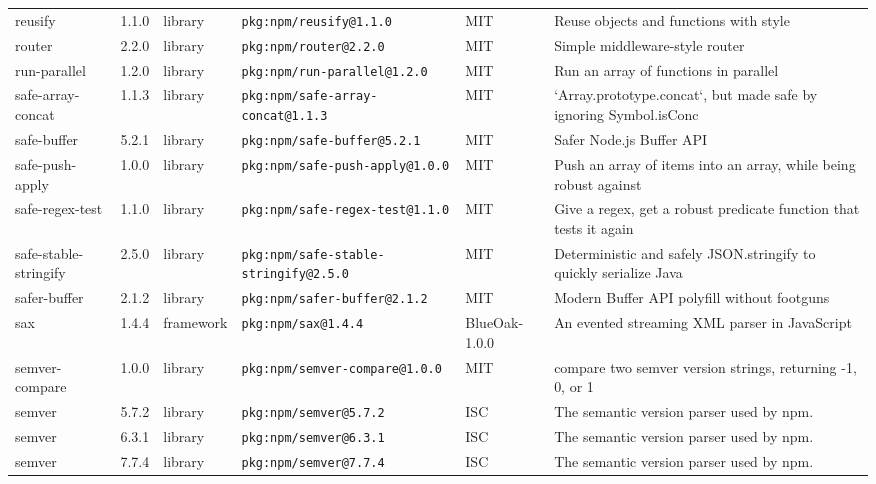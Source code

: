 \documentclass[11pt,a4paper]{article}
\begin{document}
\begin{longtable}{|p{4cm}|p{2cm}|p{1.6cm}|p{5cm}|p{1.5cm}|p{3.5cm}|}
\raggedright reusify & 1.1.0 & library & \small\texttt{pkg:npm/reusify@1.1.0} & MIT & \small Reuse objects and functions with style \\
\raggedright router & 2.2.0 & library & \small\texttt{pkg:npm/router@2.2.0} & MIT & \small Simple middleware-style router \\
\raggedright run-parallel & 1.2.0 & library & \small\texttt{pkg:npm/run-parallel@1.2.0} & MIT & \small Run an array of functions in parallel \\
\raggedright safe-array-concat & 1.1.3 & library & \small\texttt{pkg:npm/safe-array-concat@1.1.3} & MIT & \small `Array.prototype.concat`, but made safe by ignoring Symbol.isConc \\
\raggedright safe-buffer & 5.2.1 & library & \small\texttt{pkg:npm/safe-buffer@5.2.1} & MIT & \small Safer Node.js Buffer API \\
\raggedright safe-push-apply & 1.0.0 & library & \small\texttt{pkg:npm/safe-push-apply@1.0.0} & MIT & \small Push an array of items into an array, while being robust against  \\
\raggedright safe-regex-test & 1.1.0 & library & \small\texttt{pkg:npm/safe-regex-test@1.1.0} & MIT & \small Give a regex, get a robust predicate function that tests it again \\
\raggedright safe-stable-stringify & 2.5.0 & library & \small\texttt{pkg:npm/safe-stable-stringify@2.5.0} & MIT & \small Deterministic and safely JSON.stringify to quickly serialize Java \\
\raggedright safer-buffer & 2.1.2 & library & \small\texttt{pkg:npm/safer-buffer@2.1.2} & MIT & \small Modern Buffer API polyfill without footguns \\
\raggedright sax & 1.4.4 & framework & \small\texttt{pkg:npm/sax@1.4.4} & BlueOak-1.0.0 & \small An evented streaming XML parser in JavaScript \\
\raggedright semver-compare & 1.0.0 & library & \small\texttt{pkg:npm/semver-compare@1.0.0} & MIT & \small compare two semver version strings, returning -1, 0, or 1 \\
\raggedright semver & 5.7.2 & library & \small\texttt{pkg:npm/semver@5.7.2} & ISC & \small The semantic version parser used by npm. \\
\raggedright semver & 6.3.1 & library & \small\texttt{pkg:npm/semver@6.3.1} & ISC & \small The semantic version parser used by npm. \\
\raggedright semver & 7.7.4 & library & \small\texttt{pkg:npm/semver@7.7.4} & ISC & \small The semantic version parser used by npm. \\

\end{longtable}
\end{document}
